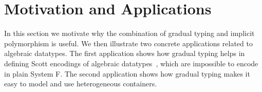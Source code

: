 \section{Motivation and Applications}
\label{sec:motivation}

In this section we motivate why the combination of gradual typing and implicit
polymorphism is useful. We then illustrate two concrete applications related to
algebraic datatypes. The first application shows how gradual typing helps in
defining Scott encodings of algebraic datatypes~\citep{curry1958combinatory,
  parigot1992recursive}, which are impossible to encode in plain System F. The
second application shows how gradual typing makes it easy to model and use
heterogeneous containers.





